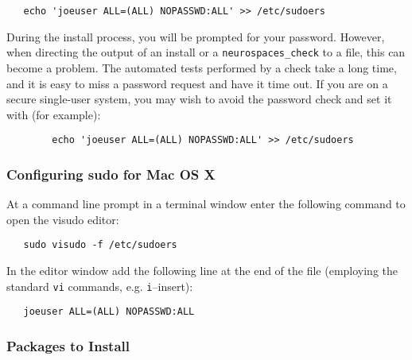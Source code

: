 \documentclass[12pt]{article}
\begin{document}
\begin{verbatim}
   echo 'joeuser ALL=(ALL) NOPASSWD:ALL' >> /etc/sudoers
\end{verbatim}

During the install process, you will be prompted for your password.
However, when directing the output of an install or a
{\tt neurospaces\_check} to a file, this can become a problem. The
automated tests performed by a check take a long time, and it is easy
to miss a password request and have it time out.  If you are on a
secure single-user system, you may wish to avoid the password check
and set it with (for example):

\begin{verbatim}
        echo 'joeuser ALL=(ALL) NOPASSWD:ALL' >> /etc/sudoers
\end{verbatim}

\subsubsection*{Configuring sudo for Mac OS X}

At a command line prompt in a terminal window enter the following command to open the visudo editor:

\begin{verbatim}
   sudo visudo -f /etc/sudoers
\end{verbatim}
In the editor window add the following line at the end of the file (employing the standard {\tt vi} commands, e.g. {\tt i}--insert):        
\begin{verbatim}
   joeuser ALL=(ALL) NOPASSWD:ALL
\end{verbatim}

\subsubsection*{Packages to Install}
\end{document}
